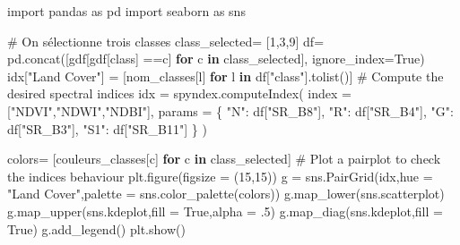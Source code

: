 \documentclass[
  11pt,
  letterpaper,
  open=any,
  twoside=false,
  french]{scrbook}
\newenvironment{Shaded}{\begin{snugshade}}{\end{snugshade}}
\newcommand{\CommentTok}[1]{\textcolor[rgb]{0.37,0.37,0.37}{#1}}
\newcommand{\ControlFlowTok}[1]{\textcolor[rgb]{0.00,0.23,0.31}{\textbf{#1}}}
\newcommand{\DecValTok}[1]{\textcolor[rgb]{0.68,0.00,0.00}{#1}}
\newcommand{\FloatTok}[1]{\textcolor[rgb]{0.68,0.00,0.00}{#1}}
\newcommand{\ImportTok}[1]{\textcolor[rgb]{0.00,0.46,0.62}{#1}}
\newcommand{\KeywordTok}[1]{\textcolor[rgb]{0.00,0.23,0.31}{\textbf{#1}}}
\newcommand{\NormalTok}[1]{\textcolor[rgb]{0.00,0.23,0.31}{#1}}
\newcommand{\OperatorTok}[1]{\textcolor[rgb]{0.37,0.37,0.37}{#1}}
\newcommand{\StringTok}[1]{\textcolor[rgb]{0.13,0.47,0.30}{#1}}
\newcommand{\VariableTok}[1]{\textcolor[rgb]{0.07,0.07,0.07}{#1}}
\begin{document}
\begin{Shaded}
\begin{Highlighting}[]
\ImportTok{import}\NormalTok{ pandas }\ImportTok{as}\NormalTok{ pd}
\ImportTok{import}\NormalTok{ seaborn }\ImportTok{as}\NormalTok{ sns}

\CommentTok{\# On sélectionne trois classes}
\NormalTok{class\_selected}\OperatorTok{=}\NormalTok{ [}\DecValTok{1}\NormalTok{,}\DecValTok{3}\NormalTok{,}\DecValTok{9}\NormalTok{]}
\NormalTok{df}\OperatorTok{=}\NormalTok{ pd.concat([gdf[gdf[}\StringTok{\textquotesingle{}class\textquotesingle{}}\NormalTok{] }\OperatorTok{==}\NormalTok{c] }\ControlFlowTok{for}\NormalTok{ c }\KeywordTok{in}\NormalTok{ class\_selected], ignore\_index}\OperatorTok{=}\VariableTok{True}\NormalTok{)}
\NormalTok{idx[}\StringTok{"Land Cover"}\NormalTok{] }\OperatorTok{=}\NormalTok{ [nom\_classes[l] }\ControlFlowTok{for}\NormalTok{ l }\KeywordTok{in}\NormalTok{ df[}\StringTok{"class"}\NormalTok{].tolist()]}
\CommentTok{\# Compute the desired spectral indices}
\NormalTok{idx }\OperatorTok{=}\NormalTok{ spyndex.computeIndex(}
\NormalTok{    index }\OperatorTok{=}\NormalTok{ [}\StringTok{"NDVI"}\NormalTok{,}\StringTok{"NDWI"}\NormalTok{,}\StringTok{"NDBI"}\NormalTok{],}
\NormalTok{    params }\OperatorTok{=}\NormalTok{ \{}
        \StringTok{"N"}\NormalTok{: df[}\StringTok{"SR\_B8"}\NormalTok{],}
        \StringTok{"R"}\NormalTok{: df[}\StringTok{"SR\_B4"}\NormalTok{],}
        \StringTok{"G"}\NormalTok{: df[}\StringTok{"SR\_B3"}\NormalTok{],}
        \StringTok{"S1"}\NormalTok{: df[}\StringTok{"SR\_B11"}\NormalTok{]}
\NormalTok{    \}}
\NormalTok{)}

\NormalTok{colors}\OperatorTok{=}\NormalTok{ [couleurs\_classes[c] }\ControlFlowTok{for}\NormalTok{ c }\KeywordTok{in}\NormalTok{ class\_selected]}
\CommentTok{\# Plot a pairplot to check the indices behaviour}
\NormalTok{plt.figure(figsize }\OperatorTok{=}\NormalTok{ (}\DecValTok{15}\NormalTok{,}\DecValTok{15}\NormalTok{))}
\NormalTok{g }\OperatorTok{=}\NormalTok{ sns.PairGrid(idx,hue }\OperatorTok{=} \StringTok{"Land Cover"}\NormalTok{,palette }\OperatorTok{=}\NormalTok{ sns.color\_palette(colors))}
\NormalTok{g.map\_lower(sns.scatterplot)}
\NormalTok{g.map\_upper(sns.kdeplot,fill }\OperatorTok{=} \VariableTok{True}\NormalTok{,alpha }\OperatorTok{=} \FloatTok{.5}\NormalTok{)}
\NormalTok{g.map\_diag(sns.kdeplot,fill }\OperatorTok{=} \VariableTok{True}\NormalTok{)}
\NormalTok{g.add\_legend()}
\NormalTok{plt.show()}
\end{Highlighting}
\end{Shaded}
\end{document}
